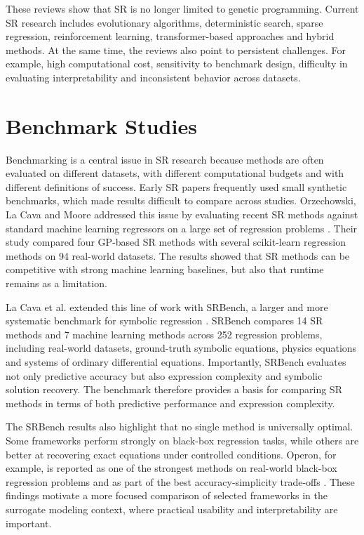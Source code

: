 \documentclass[12pt,oneside,bibtotoc,liststotoc]{scrbook}
\begin{document}
These reviews show that SR is no longer limited to genetic programming. Current SR research includes evolutionary algorithms, deterministic search, sparse regression, reinforcement learning, transformer-based approaches and hybrid methods. At the same time, the reviews also point to persistent challenges. For example, high computational cost, sensitivity to benchmark design, difficulty in evaluating interpretability and inconsistent behavior across datasets.

\section{Benchmark Studies}

Benchmarking is a central issue in SR research because methods are often evaluated on different datasets, with different computational budgets and with different definitions of success. Early SR papers frequently used small synthetic benchmarks, which made results difficult to compare across studies. Orzechowski, La Cava and Moore addressed this issue by evaluating recent SR methods against standard machine learning regressors on a large set of regression problems \cite{orzechowski2018where}. Their study compared four GP-based SR methods with several scikit-learn regression methods on 94 real-world datasets. The results showed that SR methods can be competitive with strong machine learning baselines, but also that runtime remains as a limitation.

La Cava et al. extended this line of work with SRBench, a larger and more systematic benchmark for symbolic regression \cite{lacava2021contemporary}. SRBench compares 14 SR methods and 7 machine learning methods across 252 regression problems, including real-world datasets, ground-truth symbolic equations, physics equations and systems of ordinary differential equations. Importantly, SRBench evaluates not only predictive accuracy but also expression complexity and symbolic solution recovery. The benchmark therefore provides a basis for comparing SR methods in terms of both predictive performance and expression complexity.

The SRBench results also highlight that no single method is universally optimal. Some frameworks perform strongly on black-box regression tasks, while others are better at recovering exact equations under controlled conditions. Operon, for example, is reported as one of the strongest methods on real-world black-box regression problems and as part of the best accuracy-simplicity trade-offs \cite{lacava2021contemporary}. These findings motivate a more focused comparison of selected frameworks in the surrogate modeling context, where practical usability and interpretability are important.
\end{document}
